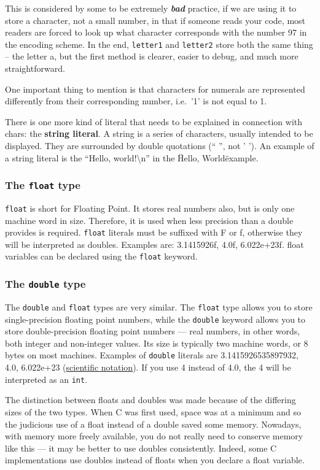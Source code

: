 This is considered by some to be extremely \textbf{\emph{bad}} practice, if we
are using it to store a character, not a small number, in that if someone reads
your code, most readers are forced to look up what character corresponds with
the number 97 in the encoding scheme. In the end, \texttt{letter1} and
\texttt{letter2} store both the same thing -- the letter a, but the first
method is clearer, easier to debug, and much more straightforward. 

One important thing to mention is that characters for numerals are represented
differently from their corresponding number, i.e.\ '1' is not equal to 1. 

There is one more kind of literal that needs to be explained in connection with
chars: the \textbf{string literal}. A string is a series of characters, usually
intended to be displayed. They are surrounded by double quotations (`` '', not
' '). An example of a string literal is the ``Hello, world!\textbackslash{}n''
in the \"Hello, World\" example.

\subsubsection{The \texttt{float} type}
\texttt{float} is short for Floating Point. It stores real numbers also, but is
only one machine word in size. Therefore, it is used when less precision than a
double provides is required. \texttt{float} literals must be suffixed with F or
f, otherwise they will be interpreted as doubles. Examples are: 3.1415926f,
4.0f, 6.022e+23f. float variables can be declared using the \texttt{float}
keyword.

\subsubsection{The \texttt{double} type}
The \texttt{double} and \texttt{float} types are very similar. The
\texttt{float} type allows you to store single-precision floating point
numbers, while the \texttt{double} keyword allows you to store double-precision
floating point numbers --- real numbers, in other words, both integer and
non-integer values. Its size is typically two machine words, or 8 bytes on most
machines. Examples of \texttt{double} literals are 3.1415926535897932, 4.0,
6.022e+23 (\href{http://en.wikipedia.org/wiki/Scientific\_notation}{scientific
notation}). If you use 4 instead of 4.0, the 4 will be interpreted as an
\texttt{int}.

The distinction between floats and doubles was made because of the differing
sizes of the two types. When C was first used, space was at a minimum and so
the judicious use of a float instead of a double saved some memory. Nowadays,
with memory more freely available, you do not really need to conserve memory
like this --- it may be better to use doubles consistently. Indeed, some C
implementations use doubles instead of floats when you declare a float
variable.

